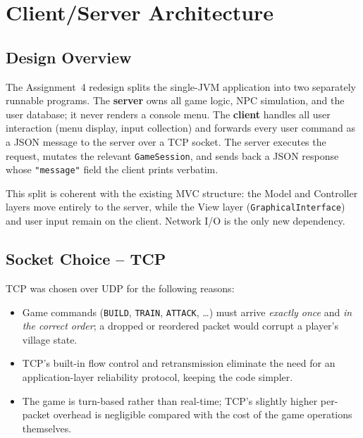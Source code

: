 \documentclass[format=acmsmall, review=false, screen=true]{acmart}
\begin{document}
\section{Client/Server Architecture}

\subsection{Design Overview}

The Assignment~4 redesign splits the single-JVM application into two separately
runnable programs.  The \textbf{server} owns all game logic, NPC simulation, and
the user database; it never renders a console menu.  The \textbf{client} handles
all user interaction (menu display, input collection) and forwards every user
command as a JSON message to the server over a TCP socket.  The server executes
the request, mutates the relevant \texttt{GameSession}, and sends back a JSON
response whose \texttt{"message"} field the client prints verbatim.

This split is coherent with the existing MVC structure: the Model and
Controller layers move entirely to the server, while the View layer
(\texttt{GraphicalInterface}) and user input remain on the client.  Network
I/O is the only new dependency.

\subsection{Socket Choice -- TCP}

TCP was chosen over UDP for the following reasons:
\begin{itemize}[noitemsep]
  \item Game commands (\texttt{BUILD}, \texttt{TRAIN}, \texttt{ATTACK}, \ldots)
        must arrive \emph{exactly once} and \emph{in the correct order}; a
        dropped or reordered packet would corrupt a player's village state.
  \item TCP's built-in flow control and retransmission eliminate the need for
        an application-layer reliability protocol, keeping the code simpler.
  \item The game is turn-based rather than real-time; TCP's slightly higher
        per-packet overhead is negligible compared with the cost of the game
        operations themselves.
\end{itemize}
\end{document}
